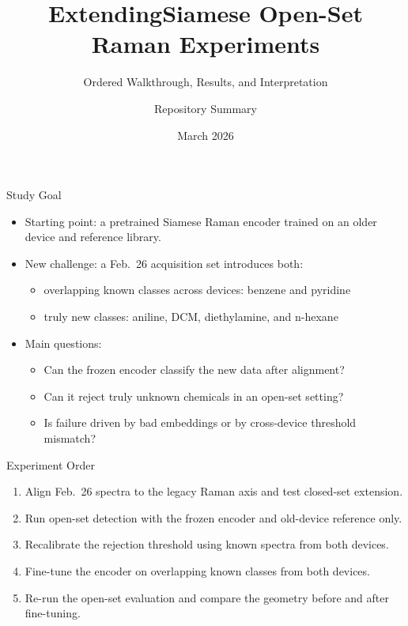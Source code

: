 \documentclass[aspectratio=169]{beamer}
\title{ExtendingSiamese Open-Set Raman Experiments}
\subtitle{Ordered Walkthrough, Results, and Interpretation}
\author{Repository Summary}
\date{March 2026}
\begin{document}
\begin{frame}
  \titlepage
\end{frame}

\begin{frame}{Study Goal}
  \begin{itemize}
    \item Starting point: a pretrained Siamese Raman encoder trained on an older device and reference library.
    \item New challenge: a Feb.\ 26 acquisition set introduces both:
    \begin{itemize}
      \item overlapping known classes across devices: benzene and pyridine
      \item truly new classes: aniline, DCM, diethylamine, and n-hexane
    \end{itemize}
    \item Main questions:
    \begin{itemize}
      \item Can the frozen encoder classify the new data after alignment?
      \item Can it reject truly unknown chemicals in an open-set setting?
      \item Is failure driven by bad embeddings or by cross-device threshold mismatch?
    \end{itemize}
  \end{itemize}
\end{frame}

\begin{frame}{Experiment Order}
  \begin{enumerate}
    \item Align Feb.\ 26 spectra to the legacy Raman axis and test closed-set extension.
    \item Run open-set detection with the frozen encoder and old-device reference only.
    \item Recalibrate the rejection threshold using known spectra from both devices.
    \item Fine-tune the encoder on overlapping known classes from both devices.
    \item Re-run the open-set evaluation and compare the geometry before and after fine-tuning.
  \end{enumerate}
\end{frame}
\end{document}
